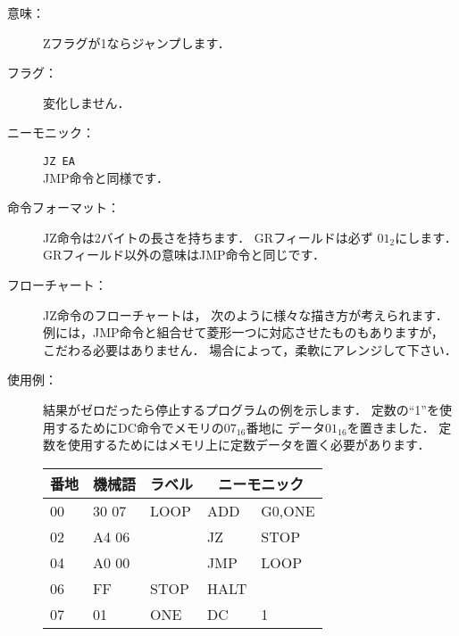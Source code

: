 \begin{description}
\item[意味：]Zフラグが1ならジャンプします．

\item[フラグ：]変化しません．

\item[ニーモニック：]{\tt JZ EA} \\
JMP命令と同様です．

\item[命令フォーマット：]JZ命令は2バイトの長さを持ちます．
GRフィールドは必ず $01_2$にします．
GRフィールド以外の意味はJMP命令と同じです．


\item[フローチャート：]JZ命令のフローチャートは，
次のように様々な描き方が考えられます．
例には，JMP命令と組合せて菱形一つに対応させたものもありますが，
こだわる必要はありません．
場合によって，柔軟にアレンジして下さい．

\begin{center}
\end{center}

\item[使用例：]
結果がゼロだったら停止するプログラムの例を示します．
定数の``1''を使用するためにDC命令でメモリの$07_{16}$番地に
データ$01_{16}$を置きました．
定数を使用するためにはメモリ上に定数データを置く必要があります．

{\tt\small\begin{center}
\begin{tabular}{|l|l|l|l l|} \hline
番地 & 機械語 & ラベル & \multicolumn{2}{|c|}{ニーモニック} \\
\hline
00 & 30 07 & LOOP & ADD  & G0,ONE  \\
02 & A4 06 &      & JZ   & STOP    \\
04 & A0 00 &      & JMP  & LOOP    \\
06 & FF    & STOP & HALT &         \\
07 & 01    & ONE  & DC   & 1       \\
\hline
\end{tabular}
\end{center}}
\end{description}

